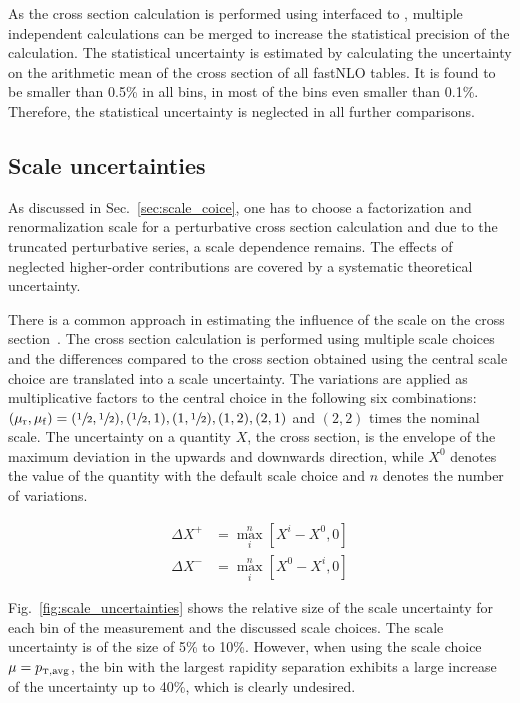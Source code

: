 As the cross section calculation is performed using \fastNLO interfaced to
\NLOJETPP, multiple independent calculations can be merged to increase the
statistical precision of the calculation. The statistical uncertainty is
estimated by calculating the uncertainty on the arithmetic mean of the cross
section of all fastNLO tables. It is found to be smaller than 0.5\% in all bins,
in most of the bins even smaller than 0.1\%. Therefore, the statistical
uncertainty is neglected in all further comparisons.

\subsection{Scale uncertainties}
\label{sec:scale_uncertainties}

As discussed in Sec.~\ref{sec:scale_coice}, one has to choose a factorization
and renormalization scale for a perturbative cross section calculation and due to
the truncated perturbative series, a scale dependence remains. The effects of
neglected higher-order contributions are covered by a systematic theoretical
uncertainty.

There is a common approach in estimating the influence of the scale on the cross
section~\cite{Cacciari:2003fi}. The cross section calculation is performed using
multiple scale choices and the differences compared to the cross section
obtained using the central scale choice are translated into a scale uncertainty.
The variations are applied as multiplicative factors to the central choice in
the following six combinations: $(\mu_{\mathrm{r}}, \mu_{\mathrm{f}}) = (\sfrac{1}{2}, \sfrac{1}{2}),
(\sfrac{1}{2}, 1), (1, \sfrac{1}{2}), (1, 2), (2, 1)$ and $(2, 2)$ times the
nominal scale. The uncertainty on a quantity $X$, \eg the cross section, is the
envelope of the maximum deviation in the upwards and downwards direction, while
$X^0$ denotes the value of the quantity with the default scale choice and $n$
denotes the number of variations.

\begin{align*}
    \Delta X^+ &= \max_{i}^{n} \left[ X^i - X^0, 0 \right]\\
    \Delta X^- &= \max_{i}^{n} \left[ X^0 - X^i, 0 \right]
\end{align*}


Fig.~\ref{fig:scale_uncertainties} shows the relative size of the scale
uncertainty for each bin of the measurement and the discussed scale choices. The
scale uncertainty is of the size of 5\% to 10\%. However, when using the scale
choice $\mu=\ptavg$, the bin with the largest rapidity separation exhibits a large
increase of the uncertainty up to 40\%, which is clearly undesired.

